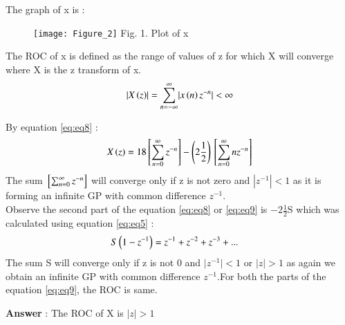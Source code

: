 \documentclass[journal,12pt,twocolumn]{IEEEtran}
\theoremstyle{remark}
\begin{document}
\vspace{15mm}

\large\textbf{} \normalsize The graph of x is :

\vspace{4mm}

\begin{figure}[!ht]
    \begin{center}
    \texttt{[image: Figure\_2]}
    Fig. 1. Plot of x \\
    \end{center}
\end{figure}

\FloatBarrier

The ROC of x is defined as the range of values of z for which X will converge where X is the z transform of x.\\
\begin{align}
   \lvert X\left(z\right) \rvert  = \sum_{n = -\infty}^{\infty}\lvert x\left(n\right)z^{-n}\rvert < \infty
\end{align}

By equation \eqref{eq:eq8} :\\
\begin{align}
X\left(z\right) = 18{}\left[\sum_{n=0}^{\infty}z^{-n}\right] - \left(2\frac{1}{2}\right){}\left[\sum_{n=0}^{\infty}nz^{-n}\right] \label{eq:eq9}
\end{align}
The sum $ {}\left[\sum_{n=0}^{\infty}z^{-n}\right]$ will converge only if z is not zero and $\left|z^{-1}\right| < 1$ as it is forming an infinite GP with common difference $z^{-1}$.\\

Observe the second part of the equation \eqref{eq:eq8} or \eqref{eq:eq9} is $-2\frac{1}{2}$S which was calculated using equation \eqref{eq:eq5} : \\
\begin{align}
    S\left(1-z^{-1}\right) &= z^{-1} + z^{-2} + z^{-3} + ... 
\end{align}
The sum S will converge only if z is not 0 and $\lvert z^{-1} \rvert < 1 $ or $ \lvert z \rvert > 1$ as again we obtain an infinite GP with common difference $z^{-1}$.For both the parts of the equation \eqref{eq:eq9}, the ROC is same.

\vspace{4mm}

\large\textbf{Answer} : \normalsize The ROC of X is  $|z| > 1$
\end{document}
